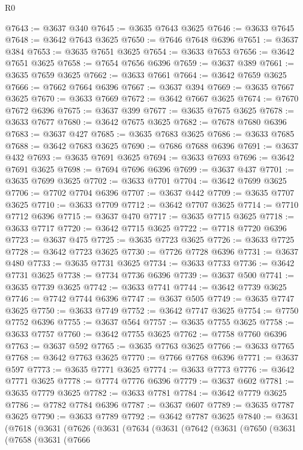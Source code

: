 \begin{lexlean}{R0}
\begin{coremodule}
@7643 := @3637 @340
@7645 := @3635 @7643 @3625
@7646 := @3633 @7645
@7648 := @3642 @7643 @3625
@7650 := @7646 @7648 @6396
@7651 := @3637 @384
@7653 := @3635 @7651 @3625
@7654 := @3633 @7653
@7656 := @3642 @7651 @3625
@7658 := @7654 @7656 @6396
@7659 := @3637 @389
@7661 := @3635 @7659 @3625
@7662 := @3633 @7661
@7664 := @3642 @7659 @3625
@7666 := @7662 @7664 @6396
@7667 := @3637 @394
@7669 := @3635 @7667 @3625
@7670 := @3633 @7669
@7672 := @3642 @7667 @3625
@7674 := @7670 @7672 @6396
@7675 := @3637 @399
@7677 := @3635 @7675 @3625
@7678 := @3633 @7677
@7680 := @3642 @7675 @3625
@7682 := @7678 @7680 @6396
@7683 := @3637 @427
@7685 := @3635 @7683 @3625
@7686 := @3633 @7685
@7688 := @3642 @7683 @3625
@7690 := @7686 @7688 @6396
@7691 := @3637 @432
@7693 := @3635 @7691 @3625
@7694 := @3633 @7693
@7696 := @3642 @7691 @3625
@7698 := @7694 @7696 @6396
@7699 := @3637 @437
@7701 := @3635 @7699 @3625
@7702 := @3633 @7701
@7704 := @3642 @7699 @3625
@7706 := @7702 @7704 @6396
@7707 := @3637 @442
@7709 := @3635 @7707 @3625
@7710 := @3633 @7709
@7712 := @3642 @7707 @3625
@7714 := @7710 @7712 @6396
@7715 := @3637 @470
@7717 := @3635 @7715 @3625
@7718 := @3633 @7717
@7720 := @3642 @7715 @3625
@7722 := @7718 @7720 @6396
@7723 := @3637 @475
@7725 := @3635 @7723 @3625
@7726 := @3633 @7725
@7728 := @3642 @7723 @3625
@7730 := @7726 @7728 @6396
@7731 := @3637 @480
@7733 := @3635 @7731 @3625
@7734 := @3633 @7733
@7736 := @3642 @7731 @3625
@7738 := @7734 @7736 @6396
@7739 := @3637 @500
@7741 := @3635 @7739 @3625
@7742 := @3633 @7741
@7744 := @3642 @7739 @3625
@7746 := @7742 @7744 @6396
@7747 := @3637 @505
@7749 := @3635 @7747 @3625
@7750 := @3633 @7749
@7752 := @3642 @7747 @3625
@7754 := @7750 @7752 @6396
@7755 := @3637 @564
@7757 := @3635 @7755 @3625
@7758 := @3633 @7757
@7760 := @3642 @7755 @3625
@7762 := @7758 @7760 @6396
@7763 := @3637 @592
@7765 := @3635 @7763 @3625
@7766 := @3633 @7765
@7768 := @3642 @7763 @3625
@7770 := @7766 @7768 @6396
@7771 := @3637 @597
@7773 := @3635 @7771 @3625
@7774 := @3633 @7773
@7776 := @3642 @7771 @3625
@7778 := @7774 @7776 @6396
@7779 := @3637 @602
@7781 := @3635 @7779 @3625
@7782 := @3633 @7781
@7784 := @3642 @7779 @3625
@7786 := @7782 @7784 @6396
@7787 := @3637 @607
@7789 := @3635 @7787 @3625
@7790 := @3633 @7789
@7792 := @3642 @7787 @3625
@7840 := @3631
    (@7618
      (@3631
        (@7626
          (@3631
            (@7634
              (@3631
                (@7642
                  (@3631
                    (@7650
                      (@3631
                        (@7658
                          (@3631
                            (@7666

\end{coremodule}
\end{lexlean}
